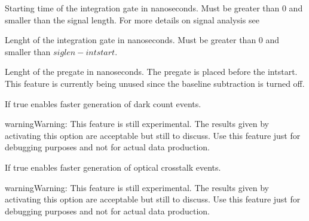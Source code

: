 \documentclass[letterpaper,10pt,english]{sphinxmanual}
\begin{document}
\begin{fulllineitems}
Starting time of the integration gate in nanoseconds. Must be greater than 0 and smaller than the signal length. For more details on signal analysis see {\hyperref[\detokenize{theory:signalanalysistheory}]{}}

\end{fulllineitems}



\begin{fulllineitems}
Lenght of the integration gate in nanoseconds. Must be greater than 0 and smaller than \(siglen - intstart\).

\end{fulllineitems}



\begin{fulllineitems}
Lenght of the pregate in nanoseconds. The pregate is placed before the intstart. This feature is currently being unused since the baseline subtraction is turned off.

\end{fulllineitems}



\begin{fulllineitems}
If true enables faster generation of dark count events.

\begin{sphinxadmonition}{warning}{Warning:}
This feature is still experimental. The results given by activating this option are acceptable but still to discuss.
Use this feature just for debugging purposes and not for actual data production.
\end{sphinxadmonition}

\end{fulllineitems}



\begin{fulllineitems}
If true enables faster generation of optical crosstalk events.

\begin{sphinxadmonition}{warning}{Warning:}
This feature is still experimental. The results given by activating this option are acceptable but still to discuss.
Use this feature just for debugging purposes and not for actual data production.
\end{sphinxadmonition}

\end{fulllineitems}
\end{document}
